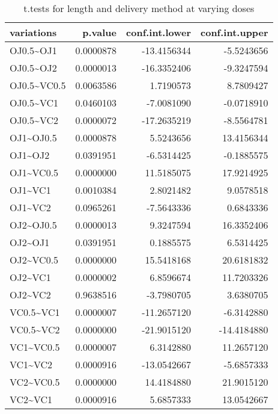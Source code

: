 \begin{table}

\caption{\label{tab:t.test_tables}t.tests for length and delivery method at varying doses}
\centering
\begin{tabular}[t]{lrrr}
\toprule
variations & p.value & conf.int.lower & conf.int.upper\\
\midrule
OJ0.5\textasciitilde{}OJ1 & 0.0000878 & -13.4156344 & -5.5243656\\
OJ0.5\textasciitilde{}OJ2 & 0.0000013 & -16.3352406 & -9.3247594\\
OJ0.5\textasciitilde{}VC0.5 & 0.0063586 & 1.7190573 & 8.7809427\\
OJ0.5\textasciitilde{}VC1 & 0.0460103 & -7.0081090 & -0.0718910\\
OJ0.5\textasciitilde{}VC2 & 0.0000072 & -17.2635219 & -8.5564781\\
\addlinespace
OJ1\textasciitilde{}OJ0.5 & 0.0000878 & 5.5243656 & 13.4156344\\
OJ1\textasciitilde{}OJ2 & 0.0391951 & -6.5314425 & -0.1885575\\
OJ1\textasciitilde{}VC0.5 & 0.0000000 & 11.5185075 & 17.9214925\\
OJ1\textasciitilde{}VC1 & 0.0010384 & 2.8021482 & 9.0578518\\
OJ1\textasciitilde{}VC2 & 0.0965261 & -7.5643336 & 0.6843336\\
\addlinespace
OJ2\textasciitilde{}OJ0.5 & 0.0000013 & 9.3247594 & 16.3352406\\
OJ2\textasciitilde{}OJ1 & 0.0391951 & 0.1885575 & 6.5314425\\
OJ2\textasciitilde{}VC0.5 & 0.0000000 & 15.5418168 & 20.6181832\\
OJ2\textasciitilde{}VC1 & 0.0000002 & 6.8596674 & 11.7203326\\
OJ2\textasciitilde{}VC2 & 0.9638516 & -3.7980705 & 3.6380705\\
\addlinespace
VC0.5\textasciitilde{}VC1 & 0.0000007 & -11.2657120 & -6.3142880\\
VC0.5\textasciitilde{}VC2 & 0.0000000 & -21.9015120 & -14.4184880\\
VC1\textasciitilde{}VC0.5 & 0.0000007 & 6.3142880 & 11.2657120\\
VC1\textasciitilde{}VC2 & 0.0000916 & -13.0542667 & -5.6857333\\
VC2\textasciitilde{}VC0.5 & 0.0000000 & 14.4184880 & 21.9015120\\
\addlinespace
VC2\textasciitilde{}VC1 & 0.0000916 & 5.6857333 & 13.0542667\\
\bottomrule
\end{tabular}
\end{table}


